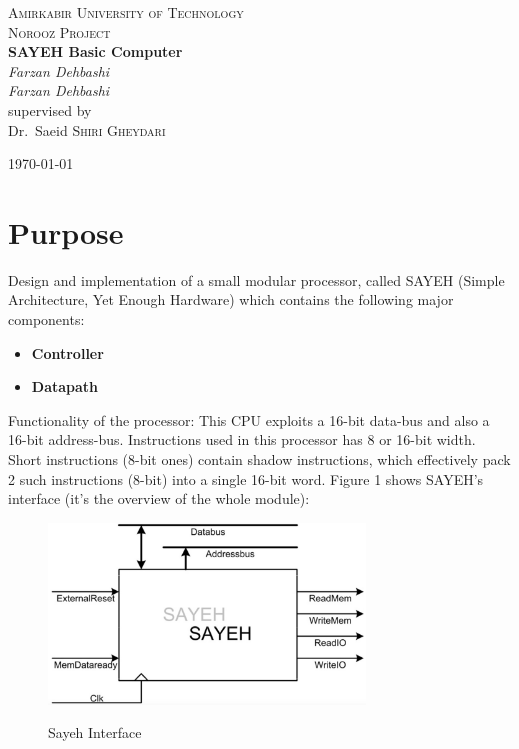 \documentclass{report}
\begin{document}
\begin{titlepage}
	\centering

	{\scshape\LARGE Amirkabir University of Technology}\\
	\vspace{1cm}
	{\scshape\Large Norooz Project}\\
	\vspace{1.5cm}
	{\huge\bfseries SAYEH Basic Computer}\\
	\vspace{2cm}
	{\Large\itshape Farzan Dehbashi}\\
	{\Large\itshape Farzan Dehbashi}\\
	\vfill
	supervised by\\
	Dr.~Saeid \textsc{Shiri Gheydari}\\

	\vfill

	{\large \today}\\
\end{titlepage}
\newpage

\tableofcontents
\newpage

\section{Purpose}
\par
Design and implementation of a small modular processor, called SAYEH (Simple Architecture, Yet Enough Hardware)
which contains the following major components:

\begin{itemize}
	\item \textbf{Controller}
	\item \textbf{Datapath}
\end{itemize}

\par
Functionality of the processor:
This CPU exploits a 16-bit data-bus and also a 16-bit address-bus.
Instructions used in this processor has 8 or 16-bit width.
Short instructions (8-bit ones) contain shadow instructions,
which effectively pack 2 such instructions (8-bit) into a single
16-bit word. Figure 1 shows SAYEH’s interface
(it's the overview of the whole module):

\begin{figure}[ht]
	\centering
	\includegraphics[width=0.75\textwidth]{figs/fig1}\\
	\caption{Sayeh Interface}
\end{figure}
\end{document}
